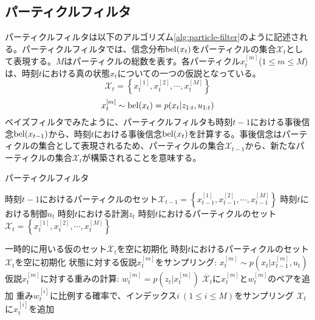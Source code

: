 \documentclass[dvipdfmx,a4paper]{jsarticle}
\begin{document}
\subsection{パーティクルフィルタ}
パーティクルフィルタは以下のアルゴリズム\ref{alg:particle-filter}のように記述される。パーティクルフィルタでは、信念分布$\operatorname{bel}(x_t)$をパーティクルの集合$\mathcal{X}_t$として表現する。$M$はパーティクルの総数を表す。各パーティクル$x_t^{[m]}$($1 \le m \le M$)は、時刻$t$における真の状態$x_t$についての一つの仮説となっている。
\begin{equation}
	\mathcal{X}_t = \left\{ x_t^{[1]}, x_t^{[2]}, \cdots, x_t^{[M]} \right\}
\end{equation}
\begin{equation}
	x_t^{[m]} \sim \operatorname{bel}(x_t) = p(x_t | z_{1 : t}, u_{1 : t})
\end{equation}
ベイズフィルタでみたように、パーティクルフィルタも時刻$t - 1$における事後信念$\operatorname{bel}(x_{t - 1})$から、時刻$t$における事後信念$\operatorname{bel}(x_t)$を計算する。事後信念はパーティクルの集合として表現されるため、パーティクルの集合$\mathcal{X}_{t - 1}$から、新たなパーティクルの集合$\mathcal{X}_t$が構築されることを意味する。

\begin{algorithm}[H]
	\caption{パーティクルフィルタ}
	\label{alg:particle-filter}
	\begin{algorithmic}[1]
		\Require
			\Statex 時刻$t - 1$におけるパーティクルのセット$\mathcal{X}_{t - 1} = \left\{ x_{t - 1}^{[1]}, x_{t - 1}^{[2]}, \cdots, x_{t - 1}^{[M]} \right\}$
			\Statex 時刻$t$における制御$u_t$
			\Statex 時刻$t$における計測$z_t$
		\Ensure
			\Statex 時刻$t$におけるパーティクルのセット$\mathcal{X}_t = \left\{ x_t^{[1]}, x_t^{[2]}, \cdots, x_t^{[M]} \right\}$ \newline
		
		\State 一時的に用いる仮のセット$\overline{\mathcal{X}}_t$を空に初期化
		\State 時刻$t$におけるパーティクルのセット$\mathcal{X}_t$を空に初期化
			\State 状態に対する仮説$x_t^{[m]}$をサンプリング: $x_t^{[m]} \sim p(x_t | x_{t - 1}^{[m]}, u_t)$
			\State 仮説$x_t^{[m]}$に対する重みの計算: $w_t^{[m]} = p(z_t | x_t^{[m]})$
			\State $\overline{\mathcal{X}}_t$に$x_t^{[m]}$と$w_t^{[m]}$のペアを追加
		\EndFor
			\State 重み$w_t^{[i]}$に比例する確率で、インデックス$i \ (1 \le i \le M)$をサンプリング
			\State $\mathcal{X}_t$に$x_t^{[i]}$を追加
		\EndFor
	\end{algorithmic}
\end{algorithm}
\end{document}

